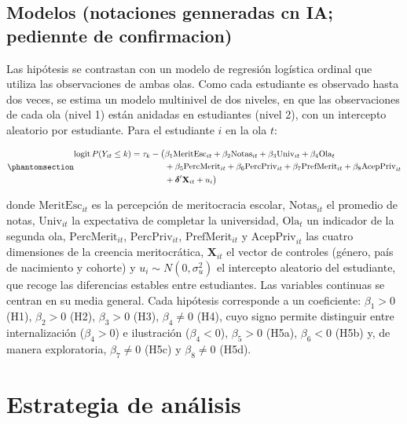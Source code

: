 \documentclass[
  spanish,
  a4paper,
  oneside]{scrbook}
\begin{document}
\subsection{Modelos (notaciones genneradas cn IA; pediennte de
confirmacion)}\label{modelos-notaciones-genneradas-cn-ia-pediennte-de-confirmacion}

Las hipótesis se contrastan con un modelo de regresión logística ordinal
que utiliza las observaciones de ambas olas. Como cada estudiante es
observado hasta dos veces, se estima un modelo multinivel de dos
niveles, en que las observaciones de cada ola (nivel 1) están anidadas
en estudiantes (nivel 2), con un intercepto aleatorio por estudiante.
Para el estudiante \(i\) en la ola \(t\):

\begin{equation}\protect\phantomsection\label{eq-modelo}{
\begin{aligned}
\text{logit}\,P(Y_{it} \le k) = \tau_k - \big(&\beta_1 \text{MeritEsc}_{it} + \beta_2 \text{Notas}_{it} + \beta_3 \text{Univ}_{it} + \beta_4 \text{Ola}_t \\
&+ \beta_5 \text{PercMerit}_{it} + \beta_6 \text{PercPriv}_{it} + \beta_7 \text{PrefMerit}_{it} + \beta_8 \text{AcepPriv}_{it} \\
&+ \boldsymbol{\delta}'\mathbf{X}_{it} + u_i\big)
\end{aligned}
}\end{equation}

donde \(\text{MeritEsc}_{it}\) es la percepción de meritocracia escolar,
\(\text{Notas}_{it}\) el promedio de notas, \(\text{Univ}_{it}\) la
expectativa de completar la universidad, \(\text{Ola}_t\) un indicador
de la segunda ola, \(\text{PercMerit}_{it}\), \(\text{PercPriv}_{it}\),
\(\text{PrefMerit}_{it}\) y \(\text{AcepPriv}_{it}\) las cuatro
dimensiones de la creencia meritocrática, \(\mathbf{X}_{it}\) el vector
de controles (género, país de nacimiento y cohorte) y
\(u_i \sim N(0, \sigma_u^2)\) el intercepto aleatorio del estudiante,
que recoge las diferencias estables entre estudiantes. Las variables
continuas se centran en su media general. Cada hipótesis corresponde a
un coeficiente: \(\beta_1 > 0\) (H1), \(\beta_2 > 0\) (H2),
\(\beta_3 > 0\) (H3), \(\beta_4 \neq 0\) (H4), cuyo signo permite
distinguir entre internalización (\(\beta_4 > 0\)) e ilustración
(\(\beta_4 < 0\)), \(\beta_5 > 0\) (H5a), \(\beta_6 < 0\) (H5b) y, de
manera exploratoria, \(\beta_7 \neq 0\) (H5c) y \(\beta_8 \neq 0\)
(H5d).

\section{Estrategia de análisis}\label{estrategia-de-anuxe1lisis}
\end{document}
